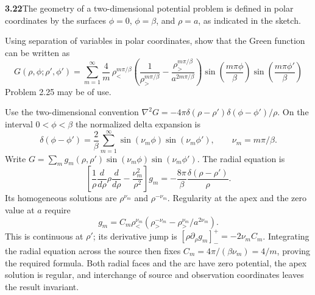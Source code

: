 \par\bigskip
\noindent\textbf{3.22}\quad The geometry of a two-dimensional potential problem is defined in polar coordinates by the surfaces $\phi=0$, $\phi=\beta$, and $\rho=a$, as indicated in the sketch.

\begin{center}
\end{center}

Using separation of variables in polar coordinates, show that the Green function can be written as
\[
G(\rho,\phi;\rho',\phi')=\sum_{m=1}^{\infty}\frac{4}{m}\,\rho_{<}^{m\pi/\beta}\left(\frac{1}{\rho_{>}^{m\pi/\beta}}-\frac{\rho_{>}^{m\pi/\beta}}{a^{2m\pi/\beta}}\right)\sin\!\left(\frac{m\pi\phi}{\beta}\right)\sin\!\left(\frac{m\pi\phi'}{\beta}\right)
\]
Problem 2.25 may be of use.
\solution

Use the two-dimensional convention
$\nabla^2G=-4\pi\delta(\rho-\rho')\delta(\phi-\phi')/\rho$.
On the interval $0<\phi<\beta$ the normalized delta expansion is
\[
\delta(\phi-\phi')=\frac2\beta\sum_{m=1}^\infty
\sin(\nu_m\phi)\sin(\nu_m\phi'),\qquad\nu_m=m\pi/\beta.
\]
Write $G=\sum_m g_m(\rho,\rho')\sin(\nu_m\phi)\sin(\nu_m\phi')$.
The radial equation is
\[
\left[\frac1\rho\frac d{d\rho}\rho\frac d{d\rho}
-\frac{\nu_m^2}{\rho^2}\right]g_m
=-\frac{8\pi}{\beta}\frac{\delta(\rho-\rho')}{\rho}.
\]
Its homogeneous solutions are $\rho^{\nu_m}$ and $\rho^{-\nu_m}$.
Regularity at the apex and the zero value at $a$ require
\[
g_m=C_m\rho_<^{\nu_m}
(\rho_>^{-\nu_m}-\rho_>^{\nu_m}/a^{2\nu_m}).
\]
This is continuous at $\rho'$; its derivative jump is
$[\rho\partial_\rho g_m]_-^+=-2\nu_mC_m$.
Integrating the radial equation across the source then fixes
$C_m=4\pi/(\beta\nu_m)=4/m$, proving the required formula.
Both radial faces and the arc have zero potential, the apex solution
is regular, and interchange of source and observation coordinates
leaves the result invariant.

